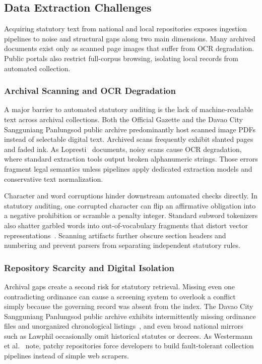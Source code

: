     \subsection{Data Extraction Challenges}
    Acquiring statutory text from national and local repositories exposes ingestion pipelines to noise and structural gaps along two main dimensions. Many archived documents exist only as scanned page images that suffer from OCR degradation. Public portals also restrict full-corpus browsing, isolating local records from automated collection.

        \subsubsection{Archival Scanning and OCR Degradation}
        A major barrier to automated statutory auditing is the lack of machine-readable text across archival collections. Both the Official Gazette and the Davao City Sangguniang Panlungsod public archive predominantly host scanned image PDFs instead of selectable digital text. Archived scans frequently exhibit slanted pages and faded ink. As Lopresti~\cite{lopresti2008optical} documents, noisy scans cause OCR degradation, where standard extraction tools output broken alphanumeric strings. Those errors fragment legal semantics unless pipelines apply dedicated extraction models and conservative text normalization.

        Character and word corruptions hinder downstream automated checks directly. In statutory auditing, one corrupted character can flip an affirmative obligation into a negative prohibition or scramble a penalty integer. Standard subword tokenizers also shatter garbled words into out-of-vocabulary fragments that distort vector representations~\cite{rust2021how}. Scanning artifacts further obscure section headers and numbering and prevent parsers from separating independent statutory rules.

        \subsubsection{Repository Scarcity and Digital Isolation}
        Archival gaps create a second risk for statutory retrieval. Missing even one contradicting ordinance can cause a screening system to overlook a conflict simply because the governing record was absent from the index. The Davao City Sangguniang Panlungsod public archive exhibits intermittently missing ordinance files and unorganized chronological listings~\cite{spdavao2026}, and even broad national mirrors such as Lawphil occasionally omit historical statutes or decrees. As Westermann et al.~\cite{Westermann2019computer} note, patchy repositories force developers to build fault-tolerant collection pipelines instead of simple web scrapers.

